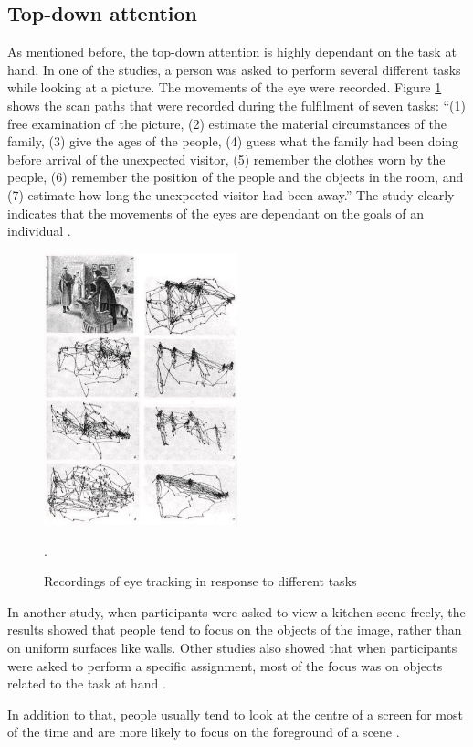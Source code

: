 \subsection{Top-down attention}\label{subsec:topdown_attention}
As mentioned before, the top-down attention is highly dependant on the task at hand. In one of the studies, a person was asked to perform several different tasks while looking at a picture. The movements of the eye were recorded. Figure \ref{fig:eye_movement_recording} shows the scan paths that were recorded during the fulfilment of seven tasks: “(1) free examination of the picture, (2) estimate the material circumstances of the family, (3) give the ages of the people, (4) guess what the family had been doing before arrival of the unexpected visitor, (5) remember the clothes worn by the people, (6) remember the position of the people and the objects in the room, and (7) estimate how long the unexpected visitor had been away.” The study clearly indicates that the movements of the eyes are dependant on the goals of an individual \cite{sundstedt2012gazing}. 

\begin{figure}[h!]
	\centering
	\includegraphics[width=0.5\textwidth]{figures/eye_movement_recording.jpg}
	\caption{Recordings of eye tracking in response to different tasks \cite{sundstedt2012gazing}}.\label{fig:eye_movement_recording}
\end{figure}

In another study, when participants were asked to view a kitchen scene freely, the results showed that people tend to focus on the objects of the image, rather than on uniform surfaces like walls. Other studies also showed that when participants were asked to perform a specific assignment, most of the focus was on objects related to the task at hand \cite{sundstedt2012gazing}. 


In addition to that, people usually tend to look at the centre of a screen for most of the time and are more likely to focus on the foreground of a scene \cite{osberger1998automatic}.